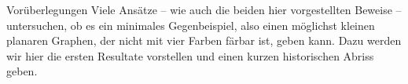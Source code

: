 \begin{chapter}{Vorüberlegungen}
  Viele Ansätze -- wie auch die beiden hier vorgestellten Beweise -- untersuchen, ob es ein minimales Gegenbeispiel, also einen möglichst kleinen planaren Graphen, der nicht mit vier Farben färbar ist, geben kann. Dazu werden wir hier die ersten Resultate vorstellen und einen kurzen historischen Abriss geben.

  
  
\end{chapter}
